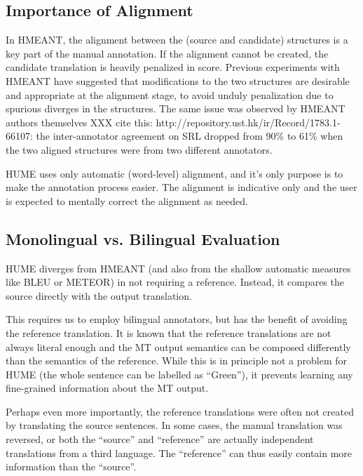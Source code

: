 \documentclass[11pt]{article}
\newcommand{\XXX}[1]{{\color{red}XXX #1}} %
\def\parcite#1{\cite{#1}}
\begin{document}
\subsection{Importance of Alignment}

In HMEANT, the alignment between the (source and candidate) structures is a key
part of the manual annotation. If the alignment cannot be created, the candidate
translation is heavily penalized in score.
Previous experiments with HMEANT
\parcite{bojar:wu:ssst:2012,chuchunkov-tarelkin-galinskaya:2014:SSST-8} have
suggested that modifications to the two structures are desirable and appropriate
at the alignment stage, to avoid unduly penalization due to spurious diverges in
the structures.
The same issue was observed by HMEANT authors themselves \parcite{XXXcite}
\XXX{cite this: http://repository.ust.hk/ir/Record/1783.1-66107}: the
inter-annotator agreement on SRL dropped from 90\% to 61\% 
when the two aligned structures were from two different annotators.

HUME uses only automatic (word-level) alignment, and it's only purpose is to
make the annotation process easier. The alignment is indicative only and the
user is expected to mentally correct the alignment as needed.


\subsection{Monolingual vs. Bilingual Evaluation}
HUME diverges from HMEANT (and also from the shallow automatic measures
like BLEU or
METEOR) in not requiring a reference.
Instead, it compares the source directly with the output
translation.

This requires us to employ bilingual annotators, but has the benefit of avoiding
the reference translation. It is known that the reference translations are not
always literal enough and the MT output semantics can be composed differently
than the semantics of the reference. While this is in principle not a problem
for HUME (the whole sentence can be labelled as ``Green''), it prevents learning
any fine-grained information about the MT output.

Perhaps even more importantly,
the reference translations were often not created by translating the source
sentences. In some cases, the manual translation was reversed, or both the
``source'' and ``reference'' are actually independent translations from a third
language. The ``reference'' can thus easily contain more information than the
``source''.
\end{document}
